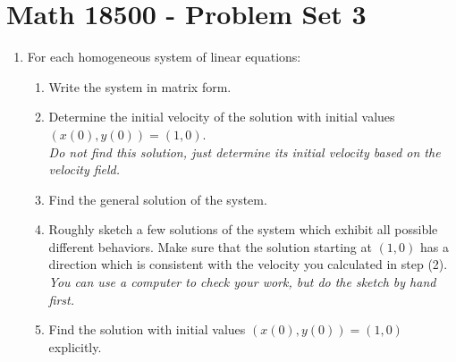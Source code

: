 \documentclass[10pt,psamsfonts,reqno,oneside,letterpaper]{amsart}
\begin{document}
	
	
	\section*{Math 18500 - Problem Set 3}
	\begin{enumerate}[I]
	\item For each homogeneous system of linear equations:
	\begin{enumerate}[(1)]
		\item Write the system in matrix form.
		\item Determine the initial velocity of the solution with initial values $(x(0), y(0)) = (1,0)$. \\
		\textit{Do not find this solution, just determine its initial velocity based on the velocity field.}
		\item Find the general solution of the system.
		\item Roughly sketch a few solutions of the system which exhibit all possible different behaviors.  Make sure that the solution starting at $(1,0)$ has a direction which is consistent with the velocity you calculated in step (2). \\
		\textit{You can use a computer to check your work, but do the sketch by hand first.}
		\item Find the solution with initial values $(x(0),y(0)) = (1,0)$ explicitly.
	\end{enumerate}
	

\end{enumerate}
\end{document}
